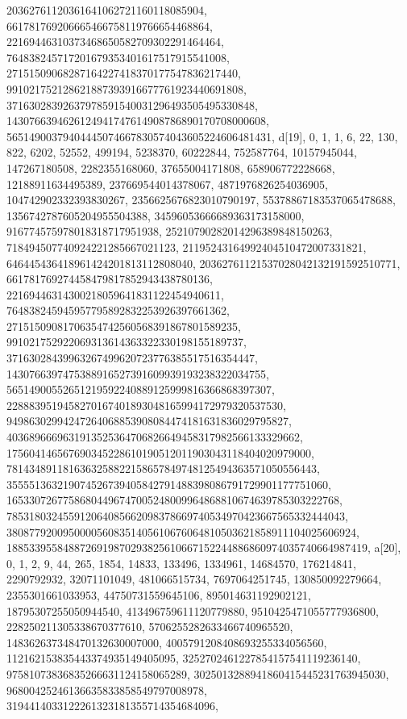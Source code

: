 {{{   20362761120361641062721160118085904, 661781769206665466758119766654468864, 
   22169446310373468650582709302291464464, 
   764838245717201679353401617517915541008, 
   27151509068287164227418370177547836217440, 
   991021752128621887393916677761923440691808, 
   37163028392637978591540031296493505495330848, 
   1430766394626124941747614908786890170708000608, 
   56514900379404445074667830574043605224606481431}}, 
 {d[19], {0, 1, 1, 6, 22, 130, 822, 6202, 52552, 499194, 5238370, 60222844, 
   752587764, 10157945044, 147267180508, 2282355168060, 37655004171808, 
   658906772228668, 12188911634495389, 237669544014378067, 
   4871976826254036905, 104742902332393830267, 2356625676823010790197, 
   55378867183537065478688, 1356742787605204955504388, 
   34596053666689363173158000, 916774575978018318717951938, 
   25210790282014296389848150263, 718494507740924221285667021123, 
   21195243164992404510472007331821, 646445436418961424201813112808040, 
   20362761121537028042132191592510771, 661781769274458479817852943438780136, 
   22169446314300218059641831122454940611, 
   764838245945957795892832253926397661362, 
   27151509081706354742560568391867801589235, 
   991021752922069313614363322330198155189737, 
   37163028439963267499620723776385517516354447, 
   1430766397475388916527391609939193238322034755, 
   56514900552651219592240889125999816366868397307, 
   2288839519458270167401893048165994172979320537530, 
   94986302994247264068853908084474181631836029795827, 
   4036896669631913525364706826649458317982566133329662, 
   175604146567690345228610190512011903043118404020979000, 
   7814348911816363258822158657849748125494363571050556443, 
   355551363219074526739405842791488398086791729901177751060, 
   16533072677586804496747005248009964868810674639785303222768, 
   785318032455912064085662098378669740534970423667565332444043, 
   38087792009500005608351405610676064810503621858911104025606924, 
   1885339558488726919870293825610667152244886860974035740664987419}}, 
 {a[20], {0, 1, 2, 9, 44, 265, 1854, 14833, 133496, 1334961, 14684570, 
   176214841, 2290792932, 32071101049, 481066515734, 7697064251745, 
   130850092279664, 2355301661033953, 44750731559645106, 895014631192902121, 
   18795307255050944540, 413496759611120779880, 9510425471055777936800, 
   228250211305338670377610, 5706255282633466740965520, 
   148362637348470132630007000, 4005791208408693255334056560, 
   112162153835443374935149405095, 3252702461227854157541119236140, 
   97581073836835266631124158065289, 3025013288941860415445231763945030, 
   96800425246136635833858549797008978, 
   3194414033122261323181355714354684096, 
}}}
